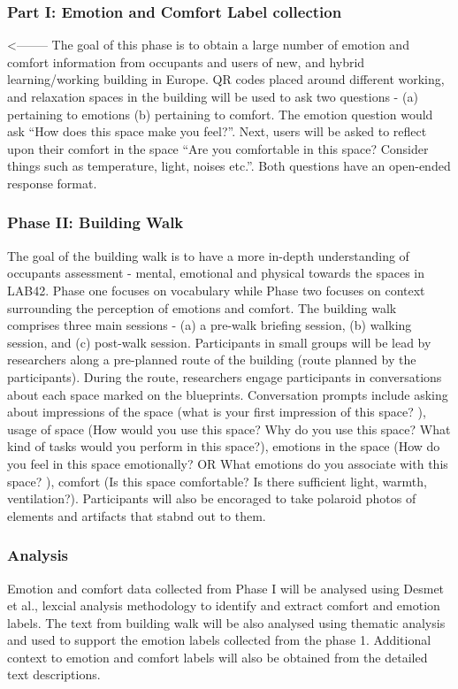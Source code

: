 \documentclass[acmconf, anonymous, review]{acmart}
\begin{document}
\subsubsection{Part I: Emotion and Comfort Label collection} <--------
The goal of this phase is to obtain a large number of emotion and comfort information from occupants and users of new, and hybrid learning/working building in Europe. QR codes placed around different working, and relaxation spaces in the building will be used to ask two questions - (a) pertaining to emotions (b) pertaining to comfort. The emotion question would ask “How does this space make you feel?”. Next, users will be asked to reflect upon their comfort in the space “Are you comfortable in this space? Consider things such as temperature, light, noises etc.”. Both questions have an open-ended response format.

\subsubsection{Phase II: Building Walk}
The goal of the building walk is to have a more in-depth understanding of occupants assessment - mental, emotional and physical towards the spaces in LAB42. Phase one focuses on vocabulary while Phase two focuses on context surrounding the perception of emotions and comfort. The building walk comprises three main sessions - (a) a pre-walk briefing session, (b) walking session, and (c) post-walk session. Participants in small groups will be lead by researchers along a pre-planned route of the building (route planned by the participants). During the route, researchers engage participants in conversations about each space marked on the blueprints. Conversation  prompts include asking about impressions of the space (what is your first impression of this space? ), usage of space (How would you use this space? Why do you use this space? What kind of tasks would you perform in this space?), emotions in the space (How do you feel in this space emotionally? OR What emotions do you associate with this space? ), comfort (Is this space comfortable?	Is there sufficient light, warmth, ventilation?). Participants will also be encoraged to take polaroid photos of elements and artifacts that stabnd out to them. 

\subsubsection{Analysis}
Emotion and comfort data collected from Phase I will be analysed using Desmet et al., lexcial analysis methodology to identify and extract comfort and emotion labels. The text from building walk will be also analysed using thematic analysis and used to support the emotion labels collected from the phase 1. Additional context to emotion and comfort labels will also be obtained from the detailed text descriptions.
\end{document}
